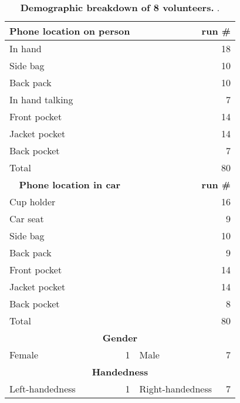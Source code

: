 \begin{table}[t]
\begin{threeparttable}
\begin{tabularx}{\columnwidth}{Xr@{\hspace{0.5in}}Xr}
\multicolumn{2}{c}{\normalsize{\textbf{Phone location on person}}} & 
\multicolumn{2}{r}{\normalsize{\textbf{run \#}}} \\
\midrule
In hand &&& 18 \\
Side bag &&& 10 \\
Back pack &&& 10 \\
In hand talking &&& 7 \\
Front pocket &&& 14 \\
Jacket pocket &&& 14 \\
Back pocket &&& 7 \\
Total &&& 80\\[0.1in]
\multicolumn{2}{c}{\normalsize{\textbf{Phone location in car}}} & 
\multicolumn{2}{r}{\normalsize{\textbf{run \#}}} \\
\midrule
Cup holder &&& 16 \\
Car seat &&& 9 \\
Side bag &&& 10 \\
Back pack &&& 9 \\
Front pocket &&& 14 \\
Jacket pocket &&& 14 \\
Back pocket &&& 8 \\
Total &&& 80\\[0.1in]
\multicolumn{4}{c}{\normalsize{\textbf{Gender}}} \\
\midrule
Female & 1 & Male & 7 \\[0.1in]
\multicolumn{4}{c}{\normalsize{\textbf{Handedness}}} \\
\midrule
Left-handedness & 1 & Right-handedness & 7 \\[0.1in]
\end{tabularx}
\end{threeparttable}
\caption{\textbf{Demographic breakdown of 8 volunteers.} .}
\label{table-experiment}
\end{table}
